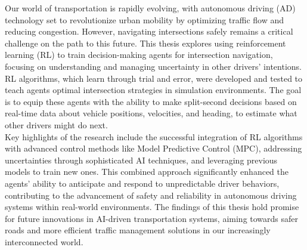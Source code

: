Our world of transportation is rapidly evolving, with autonomous driving (AD) technology set to revolutionize urban mobility by optimizing traffic flow and reducing congestion. However, navigating intersections safely remains a critical challenge on the path to this future. This thesis explores using reinforcement learning (RL) to train decision-making agents for intersection navigation, focusing on understanding and managing uncertainty in other drivers' intentions.
RL algorithms, which learn through trial and error, were developed and tested to teach agents optimal intersection strategies in simulation environments. The goal is to equip these agents with the ability to make split-second decisions based on real-time data about vehicle positions, velocities, and heading, to estimate what other drivers might do next.
\\

Key highlights of the research include the successful integration of RL algorithms with advanced control methods like Model Predictive Control (MPC), addressing uncertainties through sophisticated AI techniques, and leveraging previous models to train new ones. This combined approach significantly enhanced the agents' ability to anticipate and respond to unpredictable driver behaviors, contributing to the advancement of safety and reliability in autonomous driving systems within real-world environments. The findings of this thesis hold promise for future innovations in AI-driven transportation systems, aiming towards safer roads and more efficient traffic management solutions in our increasingly interconnected world.



